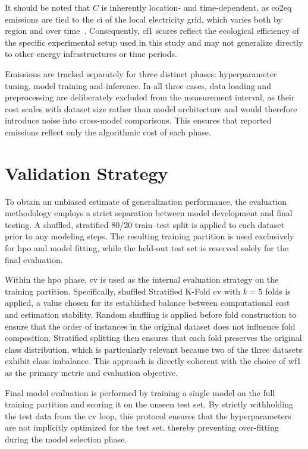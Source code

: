 It should be noted that $C$ is inherently location- and time-dependent, as \gls{co2eq} emissions are tied to the \gls{ci} of the local electricity grid, which varies both by region and over time~\cite{wrightEfficiencyNotEnough2025}. Consequently, \gls{cf1} scores reflect the ecological efficiency of the specific experimental setup used in this study and may not generalize directly to other energy infrastructures or time periods.

Emissions are tracked separately for three distinct phases: hyperparameter tuning, model training and inference. In all three cases, data loading and preprocessing are deliberately excluded from the measurement interval, as their cost scales with dataset size rather than model architecture and would therefore introduce noise into cross-model comparisons. This ensures that reported emissions reflect only the algorithmic cost of each phase.

\section{Validation Strategy}
\label{design_validation}

To obtain an unbiased estimate of generalization performance, the evaluation methodology employs a strict separation between model development and final testing. A shuffled, stratified 80/20 train--test split is applied to each dataset prior to any modeling steps. The resulting training partition is used exclusively for \gls{hpo} and model fitting, while the held-out test set is reserved solely for the final evaluation.

Within the \gls{hpo} phase, \gls{cv} is used as the internal evaluation strategy on the training partition. Specifically, shuffled Stratified K-Fold \gls{cv} with $k=5$ folds is applied, a value chosen for its established balance between computational cost and estimation stability. Random shuffling is applied before fold construction to ensure that the order of instances in the original dataset does not influence fold composition. Stratified splitting then ensures that each fold preserves the original class distribution, which is particularly relevant because two of the three datasets exhibit class imbalance. This approach is directly coherent with the choice of \gls{wf1} as the primary metric and evaluation objective.

Final model evaluation is performed by training a single model on the full training partition and scoring it on the unseen test set. By strictly withholding the test data from the \gls{cv} loop, this protocol ensures that the hyperparameters are not implicitly optimized for the test set, thereby preventing over-fitting during the model selection phase.

